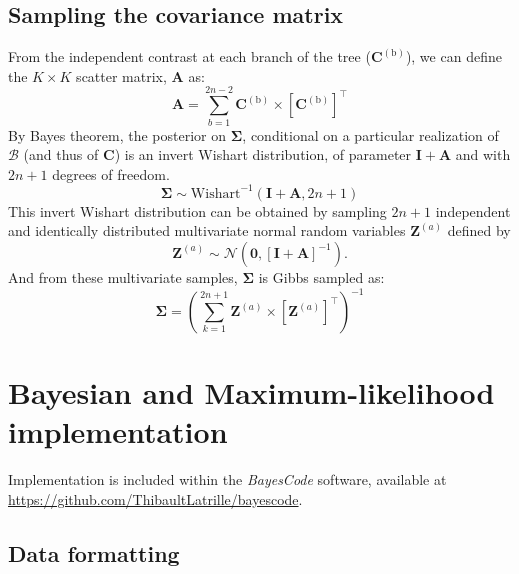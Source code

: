 \documentclass{article}
\newcommand{\MultiplyMatrix}{\times}
\newcommand{\UniDimArray}[1]{\bm{#1}}
\newcommand{\BiDimArray}[1]{\bm{#1}}
\newcommand{\tr}{^{\intercal}}
\newcommand{\inv}{^{-1}}
\newcommand{\NbrTaxa}{n}
\newcommand{\branch}{\text{b}}
\newcommand{\branchexp}{^{(\branch)}}
\newcommand{\Nbranch}{2 \NbrTaxa - 2}
\newcommand{\WishartPostDf}{2 \NbrTaxa + 1}
\newcommand{\Ntrait}{K}
\newcommand{\contrast}{\UniDimArray{C}}
\newcommand{\Covariancematrix}{\Sigma}
\newcommand{\CovarianceMatrix}{\BiDimArray{\Covariancematrix}}
\newcommand{\Identitymatrix}{\BiDimArray{I}}
\newcommand{\brownian}{\mathcal{B}}
\newcommand{\Scattermatrix}{\BiDimArray{A}}
\newcommand{\Multivariate}{\UniDimArray{Z}}
\newcommand{\indice}{a}
\newcommand{\indiceexp}{^{(\indice)}}
\newcommand{\vecZero}{\UniDimArray{0}}
\begin{document}
\subsection{Sampling the covariance matrix}\label{subsec:sampling-the-covariance-matrix}
From the independent contrast at each branch of the tree ($\contrast\branchexp$), we can define the $\Ntrait \times \Ntrait$ scatter matrix, $\Scattermatrix$ as:
\begin{equation}
    \Scattermatrix = \sum\limits_{b=1}^{\Nbranch} \contrast\branchexp \MultiplyMatrix \left[\contrast\branchexp\right]\tr\label{eq:bayes-scatter}
\end{equation}
By Bayes theorem, the {posterior} on $\CovarianceMatrix$, conditional on a particular realization of $\brownian$ (and thus of $\contrast$) is an invert Wishart distribution, of parameter $\Identitymatrix + \Scattermatrix$ and with $\WishartPostDf$ degrees of freedom.
\begin{equation}
    \CovarianceMatrix \sim \text{Wishart}^{-1}\left( \Identitymatrix + \Scattermatrix, \WishartPostDf\right)\label{eq:bayes-posterior}
\end{equation}
This invert Wishart distribution can be obtained by sampling $\WishartPostDf$ independent and identically distributed multivariate normal random variables $\Multivariate\indiceexp$ defined by
\begin{equation}
    \Multivariate\indiceexp \sim \mathcal{N} \left( \vecZero, \left[ \Identitymatrix + \Scattermatrix\right]^{-1} \right).\label{eq:bayes-multivariate}
\end{equation}
And from these multivariate samples, $\CovarianceMatrix$ is Gibbs sampled as:
\begin{equation}
    \CovarianceMatrix = \left( \sum\limits_{k=1}^{\WishartPostDf} \Multivariate\indiceexp \MultiplyMatrix  \left[\Multivariate\indiceexp \right] \tr \right)\inv \label{eq:bayes-gibbs}
\end{equation}

\section{Bayesian and Maximum-likelihood implementation}\label{sec:implementation}

Implementation is included within the \textit{BayesCode} software, available at \url{https://github.com/ThibaultLatrille/bayescode}.

\subsection{Data formatting}\label{subsec:data-formatting}
\end{document}
